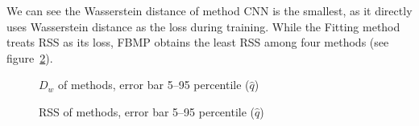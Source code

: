 We can see the Wasserstein distance of method CNN is the smallest, as it directly uses Wasserstein distance as the loss during training. While the Fitting method treats RSS as its loss, FBMP obtains the least RSS among four methods (see figure~\ref{fig:rsssummary}). 
\begin{figure}[H]
    \centering
    \resizebox{\textwidth}{!}{}
    \caption{\label{fig:wdistsummary} $D_w$ of methods, error bar 5--95 percentile ($\hat{q}$)}
\end{figure}

\begin{figure}[H]
    \centering
    \resizebox{\textwidth}{!}{}
    \caption{\label{fig:rsssummary} RSS of methods, error bar 5--95 percentile ($\hat{q}$)}
\end{figure}
